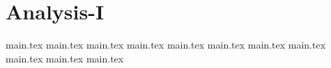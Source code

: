 \part{Analysis-I}\label{i:part}

{main.tex}
{main.tex}
{main.tex}
{main.tex}
{main.tex}
{main.tex}
{main.tex}
{main.tex}
{main.tex}
{main.tex}
{main.tex}
